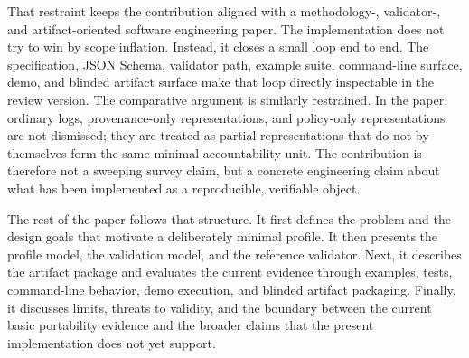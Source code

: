 That restraint keeps the contribution aligned with a methodology-, validator-, and artifact-oriented software engineering paper. The implementation does not try to win by scope inflation. Instead, it closes a small loop end to end. The specification, JSON Schema, validator path, example suite, command-line surface, demo, and blinded artifact surface make that loop directly inspectable in the review version. The comparative argument is similarly restrained. In the paper, ordinary logs, provenance-only representations, and policy-only representations are not dismissed; they are treated as partial representations that do not by themselves form the same minimal accountability unit. The contribution is therefore not a sweeping survey claim, but a concrete engineering claim about what has been implemented as a reproducible, verifiable object.

The rest of the paper follows that structure. It first defines the problem and the design goals that motivate a deliberately minimal profile. It then presents the profile model, the validation model, and the reference validator. Next, it describes the artifact package and evaluates the current evidence through examples, tests, command-line behavior, demo execution, and blinded artifact packaging. Finally, it discusses limits, threats to validity, and the boundary between the current basic portability evidence and the broader claims that the present implementation does not yet support.
